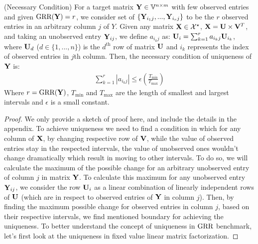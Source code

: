 \documentclass{article}
\newcommand{\sameer}[1]{\todo[color=blue!20]{\textbf{s:} #1}{}}
\begin{document}
\begin{thm:thm} (Necessary Condition)
For a target matrix $\mathbf{Y} \in \mathbb{V}^{n \times m}$ with few observed entries and given $\text{GRR}(\mathbf{Y})=r$, we consider set of $\{\mathbf{Y}_{i_1j},...,\mathbf{Y}_{i_rj}\}$ to be the $r$ observed entries in an arbitrary column $j$ of $Y$. 
Given any matrix $\mathbf{X} \in \mathcal{X}^{\star}$, $\mathbf{X}=\mathbf{U}\times \mathbf{V}^{T}$, and taking an unobserved entry $\mathbf{Y}_{ij}$, we define $a_{i_kj}$ as: 
$
\mathbf{U}_i=\sum_{k=1}^{r} a_{i_kj} \mathbf{U}_{i_k} 
$, where $\mathbf{U}_d$ ($d \in \{1,...,n\}$) is the $d^\text{th}$ row of matrix $\mathbf{U}$ and $i_k$ represents the index of observed entries in $j$th column.
Then, the necessary condition of uniqueness of $\mathbf{Y}$ is:
\begin{align}
\sum_{k=1}^{r}\left | a_{i_kj} \right | \leq  \epsilon\left(\frac{T_\text{min}}{T_\text{max}}\right)
\end{align}
Where $r=\text{GRR}(\mathbf{Y})$, $T_\text{min}$ and $T_\text{max}$ are the length of smallest and largest intervals and $\epsilon$ is a small constant. 
\begin{proof}
We only provide a sketch of proof here, and include the details in the appendix. To achieve uniqueness we need to find a condition in which for any column of $\mathbf{X}$, by changing respective row of $\mathbf{V}$, while the value of observed entries stay in the respected intervals, the value of unobserved ones wouldn't change dramatically which result in moving to other intervals. To do so, we will calculate the maximum of the possible change for an arbitrary unobserved entry of column $j$ in matrix $\mathbf{Y}$. To calculate this maximum for any unobserved entry $\mathbf{Y}_{ij}$, we consider the row $\mathbf{U}_i$ as a linear combination of linearly independent rows of $\mathbf{U}$ (which are in respect to observed entries of $\mathbf{Y}$ in column $j$). Then, by finding the maximum possible change for observed entries in column $j$, based on their respective intervals, we find mentioned boundary for achieving the uniqueness.
\iffalse
To better understand the concept of uniqueness in $\text{GRR}$ benchmark, let's first look at the uniqueness in fixed value linear matrix factorization. %


\end{proof}
\end{thm:thm}
\end{document}
